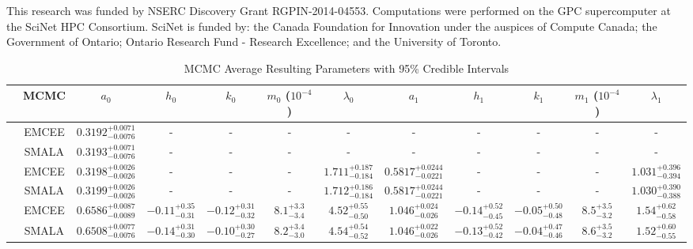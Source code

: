 \documentclass{aa}
\begin{document}
\begin{acknowledgements}
	This research was funded by NSERC Discovery Grant RGPIN-2014-04553. Computations were performed on the GPC supercomputer at the SciNet HPC Consortium. SciNet is funded by: the Canada Foundation for Innovation under the auspices of Compute Canada; the Government of Ontario; Ontario Research Fund - Research Excellence; and the University of Toronto.
\end{acknowledgements}


\pagebreak




\begin{appendix} 

\begin{table}
\caption{MCMC Average Resulting Parameters with 95\% Credible Intervals}\label{Table4}
\centering
\begin{tabular}{c c c c c c c c c c c c}        %
\hline\hline                 %
 & MCMC & $a_0$ & $h_0$ & $k_0$ & $m_0$ ($10^{-4}$) & $\lambda_0$ & $a_1$ & $h_1$ & $k_1$ & $m_1$ ($10^{-4}$) & $\lambda_1$ \\    %
\hline                        %
   \rule{0pt}{4ex}  \multirow{2}{*}{$N=1$} & EMCEE & $0.3192^{+0.0071}_{-0.0076}$ & - & - & - & - & - & - & - & - & - \\
   \rule{0pt}{4ex} & SMALA &  $0.3193^{+0.0071}_{-0.0076}$ & - & - & - & - & - & - & - & - & -\\
   \rule{0pt}{4ex}  \multirow{2}{*}{$N=4$} & EMCEE & $0.3198^{+0.0026}_{-0.0026}$ & - & - & - & $1.711^{+0.187}_{-0.184}$ & $0.5817^{+0.0244}_{-0.0221}$ & - & - & - & $1.031^{+0.396}_{-0.394}$ \\
   \rule{0pt}{4ex} & SMALA &  $0.3199^{+0.0026}_{-0.0026}$ & - & - & - & $1.712^{+0.186}_{-0.184}$ & $0.5817^{+0.0244}_{-0.0221}$ & - & - & - & $1.030^{+0.390}_{-0.388}$\\
   \rule{0pt}{4ex} \multirow{2}{*}{$N=10$} & EMCEE & $0.6586^{+0.0087}_{-0.0089}$ & $-0.11^{+0.35}_{-0.31}$ & $-0.12^{+0.31}_{-0.32}$ & $8.1^{+3.3}_{-3.4}$ & $4.52^{+0.55}_{-0.50}$ & $1.046^{+0.024}_{-0.026}$ & $-0.14^{+0.52}_{-0.45}$ & $-0.05^{+0.50}_{-0.48}$ & $8.5^{+3.5}_{-3.2}$ & $1.54^{+0.62}_{-0.58}$ \\
   \rule{0pt}{4ex} & SMALA & $0.6508^{+0.0077}_{-0.0076}$ & $-0.14^{+0.31}_{-0.30}$ & $-0.10^{+0.30}_{-0.27}$ & $8.2^{+3.4}_{-3.0}$ & $4.54^{+0.54}_{-0.52}$ & $1.046^{+0.022}_{-0.026}$ & $-0.13^{+0.52}_{-0.42}$ & $-0.04^{+0.47}_{-0.46}$ & $8.6^{+3.5}_{-3.2}$ & $1.52^{+0.60}_{-0.55}$\\
\hline  
\end{tabular}
\end{table}

\end{appendix}

\end{document}
